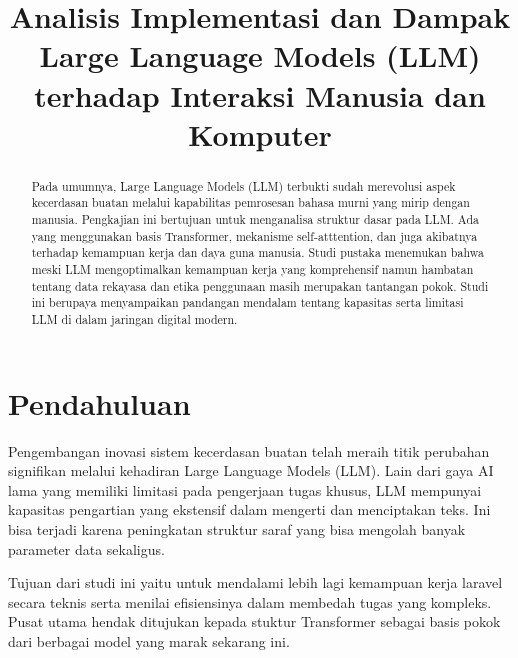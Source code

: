 \documentclass[conference]{IEEEtran}
\begin{document}
\title{Analisis Implementasi dan Dampak Large Language Models (LLM) terhadap Interaksi Manusia dan Komputer\\
}

\author{
\and
{}
\and
}
\maketitle

\begin{abstract}
Pada umumnya, Large Language Models (LLM) terbukti sudah merevolusi aspek kecerdasan buatan melalui kapabilitas pemrosesan bahasa murni yang mirip dengan manusia. Pengkajian ini bertujuan untuk menganalisa struktur dasar pada LLM. Ada yang menggunakan basis Transformer, mekanisme self-atttention, dan juga akibatnya terhadap kemampuan kerja dan daya guna manusia. Studi pustaka menemukan bahwa meski LLM mengoptimalkan kemampuan kerja yang komprehensif namun hambatan tentang data rekayasa dan etika penggunaan masih merupakan tantangan pokok. Studi ini berupaya menyampaikan pandangan mendalam tentang kapasitas serta limitasi LLM di dalam jaringan digital modern.
\end{abstract}

\section{Pendahuluan}
Pengembangan inovasi sistem kecerdasan buatan telah meraih titik perubahan signifikan melalui kehadiran Large Language Models (LLM). Lain dari gaya AI lama yang memiliki limitasi pada pengerjaan tugas khusus, LLM mempunyai kapasitas pengartian yang ekstensif dalam mengerti dan menciptakan teks. Ini bisa terjadi karena peningkatan struktur saraf yang bisa mengolah banyak parameter data sekaligus.

Tujuan dari studi ini yaitu untuk mendalami lebih lagi kemampuan kerja laravel secara teknis serta menilai efisiensinya dalam membedah tugas yang kompleks. Pusat utama hendak ditujukan kepada stuktur Transformer sebagai basis pokok dari berbagai model yang marak sekarang ini.
\end{document}

